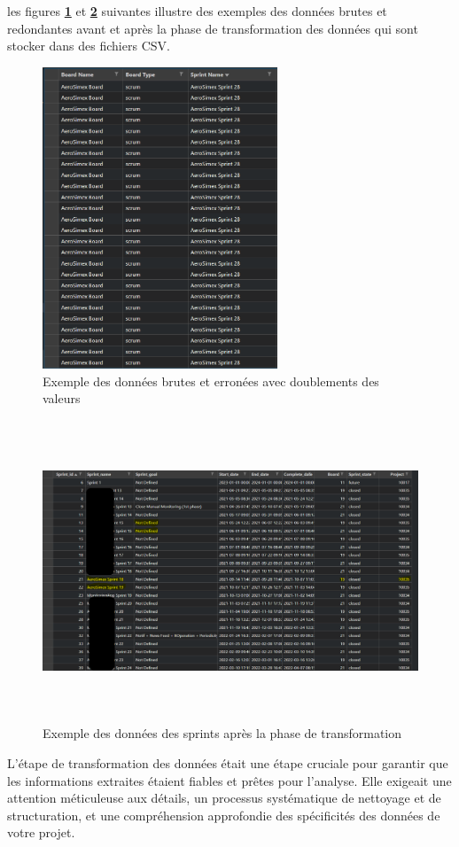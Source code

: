 \begin{itemize}
            \par les figures \textbf{\ref{fig:avant}} et \textbf{\ref{fig:apres}} suivantes illustre des exemples des données brutes et redondantes avant  et après la phase de transformation des données qui sont stocker dans des fichiers CSV.
            
            \begin{figure}[H]
                \centering
                \includegraphics[width=1\linewidth, height=9cm]{img/captures/sprints.png}
                \caption{Exemple des données brutes et erronées avec doublements des valeurs}
                \label{fig:avant}
            \end{figure}
            \begin{figure}[H]
                    \centering
                    \includegraphics[width=1\linewidth, height=9cm]{img//captures/sprintsafter.png}
                    \caption{Exemple des données des sprints après la phase de transformation}
                \label{fig:apres}

            \end{figure}
        \end{itemize}
        \par L'étape de transformation des données était une étape cruciale pour garantir que les informations extraites étaient fiables et prêtes pour l'analyse. Elle exigeait une attention méticuleuse aux détails, un processus systématique de nettoyage et de structuration, et une compréhension approfondie des spécificités des données de votre projet.
        
